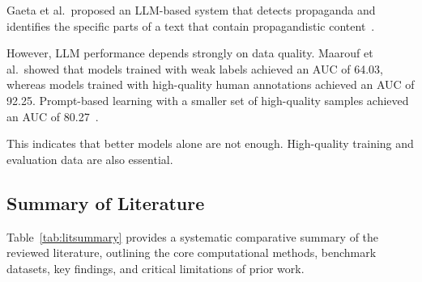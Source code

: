 Gaeta et al.\ proposed an LLM-based system that detects propaganda and identifies
the specific parts of a text that contain propagandistic content~\cite{gaeta2025}.

However, LLM performance depends strongly on data quality. Maarouf et al.\ showed
that models trained with weak labels achieved an AUC of 64.03, whereas models
trained with high-quality human annotations achieved an AUC of 92.25. Prompt-based
learning with a smaller set of high-quality samples achieved an AUC of
80.27~\cite{maarouf2024}.

This indicates that better models alone are not enough. High-quality training and
evaluation data are also essential.

\subsection{Summary of Literature}
\label{sec:lit-summary}
Table~\ref{tab:litsummary} provides a systematic comparative summary of the
reviewed literature, outlining the core computational methods, benchmark datasets,
key findings, and critical limitations of prior work.

